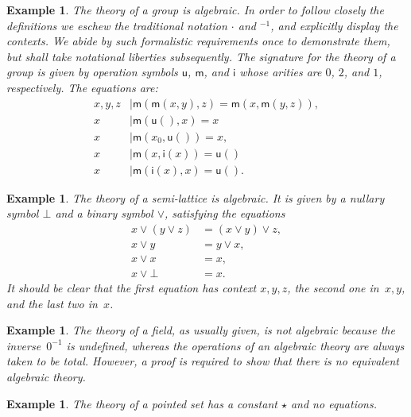 \documentclass{amsart}
\newtheorem{example}[definition]{Example}
\begin{document}
\begin{example}
  \label{ex:theory-group}
  The theory of a group is algebraic. In order to follow closely the definitions we eschew
  the traditional notation $\cdot$ and ${}^{-1}$, and explicitly display the contexts. We
  abide by such formalistic requirements once to demonstrate them, but shall take
  notational liberties subsequently.
  The signature for the theory of a group is given by operation symbols $\mathsf{u}$,
  $\mathsf{m}$, and $\mathsf{i}$ whose arities are $0$, $2$, and $1$, respectively. The
  equations are:
  \begin{align*}
    x, y, z &\mid \mathsf{m}(\mathsf{m}(x, y), z) = \mathsf{m}(x, \mathsf{m}(y, z)),\\
    x &\mid \mathsf{m}(\mathsf{u}(), x) = x \\
    x &\mid \mathsf{m}(x_0, \mathsf{u}()) = x,\\
    x &\mid \mathsf{m}(x, \mathsf{i}(x)) = \mathsf{u}()\\
    x &\mid \mathsf{m}(\mathsf{i}(x), x) = \mathsf{u}().
  \end{align*}
\end{example}

\begin{example}
  \label{ex:semi-lattice}
  The theory of a semi-lattice is algebraic. It is given by a nullary symbol $\bot$ and a
  binary symbol $\vee$, satisfying the equations
  \begin{align*}
    x \vee (y \vee z) &= (x \vee y) \vee z,\\
    x \vee y &= y \vee x,\\
    x \vee x &= x,\\
    x \vee \bot &= x.
  \end{align*}
  It should be clear that the first equation has context $x, y, z$, the second one
  in~$x, y$, and the last two in~$x$.
\end{example}

\begin{example}
  \label{ex:field}
  The theory of a field, as usually given, is not algebraic because the inverse~$0^{-1}$
  is undefined, whereas the operations of an algebraic theory are always taken to be
  total. However, a proof is required to show that there is no equivalent algebraic theory.
\end{example}

\begin{example}
  \label{ex:pointed-set}
  The theory of a \emph{pointed set} has a constant $\star$ and no equations.
\end{example}
\end{document}
